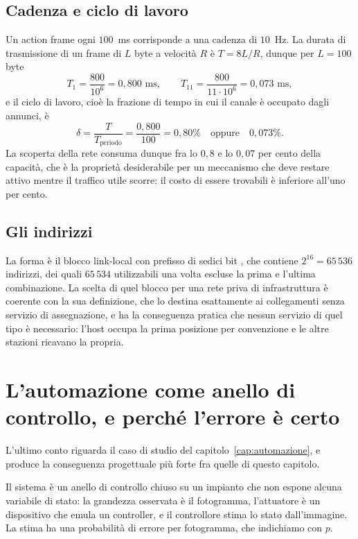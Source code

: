 \subsection{Cadenza e ciclo di lavoro}

Un action frame ogni $100$~ms corrisponde a una cadenza di $10$~Hz. La durata di trasmissione di un frame di $L$ byte a velocità $R$ è $T = 8L/R$, dunque per $L = 100$ byte
\[
T_{1} = \frac{800}{10^6} = 0{,}800 \text{ ms}, \qquad
T_{11} = \frac{800}{11 \cdot 10^6} = 0{,}073 \text{ ms},
\]
e il ciclo di lavoro, cioè la frazione di tempo in cui il canale è occupato dagli annunci, è
\[
\delta = \frac{T}{T_{\text{periodo}}} = \frac{0{,}800}{100} = 0{,}80\% \quad \text{oppure} \quad 0{,}073\%.
\]
La scoperta della rete consuma dunque fra lo $0{,}8$ e lo $0{,}07$ per cento della capacità, che è la proprietà desiderabile per un meccanismo che deve restare attivo mentre il traffico utile scorre: il costo di essere trovabili è inferiore all'uno per cento.

\subsection{Gli indirizzi}

La forma  è il blocco link-local con prefisso di sedici bit \cite{rfc3927}, che contiene $2^{16} = 65\,536$ indirizzi, dei quali $65\,534$ utilizzabili una volta escluse la prima e l'ultima combinazione. La scelta di quel blocco per una rete priva di infrastruttura è coerente con la sua definizione, che lo destina esattamente ai collegamenti senza servizio di assegnazione, e ha la conseguenza pratica che nessun servizio di quel tipo è necessario: l'host occupa la prima posizione per convenzione e le altre stazioni ricavano la propria.

\section{L'automazione come anello di controllo, e perché l'errore è certo}

L'ultimo conto riguarda il caso di studio del capitolo~\ref{cap:automazione}, e produce la conseguenza progettuale più forte fra quelle di questo capitolo.

Il sistema è un anello di controllo chiuso su un impianto che non espone alcuna variabile di stato: la grandezza osservata è il fotogramma, l'attuatore è un dispositivo che emula un controller, e il controllore stima lo stato dall'immagine. La stima ha una probabilità di errore per fotogramma, che indichiamo con $p$.

